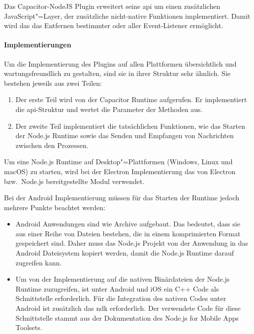 Das Capacitor-NodeJS Plugin erweitert seine \ac{api} um einen zusätzlichen JavaScript"=Layer, der zusätzliche nicht-native Funktionen implementiert.
Damit wird das das Entfernen bestimmter oder aller Event-Listener ermöglicht.

\paragraph{Implementierungen}

Um die Implementierung des Plugins auf allen Plattformen übersichtlich und wartungsfreundlich zu gestalten, sind sie in ihrer Struktur sehr ähnlich.
Sie bestehen jeweils aus zwei Teilen:

\begin{enumerate}
    \item 
    Der erste Teil wird von der Capacitor Runtime aufgerufen.
    Er implementiert die \acs{api}-Struktur und wertet die Parameter der Methoden aus.
    \item 
    Der zweite Teil implementiert die tatsächlichen Funktionen,
    wie das Starten der Node.js Runtime sowie das Senden und Empfangen von Nachrichten zwischen den Prozessen.
\end{enumerate}

Um eine Node.js Runtime auf Desktop"=Plattformen (Windows, Linux und macOS) zu starten, wird bei der Electron Implementierung das von Electron bzw.\ Node.js bereitgestellte Modul  verwendet.
\cite{electron:docs}

Bei der Android Implementierung müssen für das Starten der Runtime jedoch mehrere Punkte beachtet werden:

\begin{itemize}
    \item
    Android Anwendungen sind wie Archive aufgebaut.
    Das bedeutet, dass sie aus einer Reihe von Dateien bestehen, die in einem komprimierten Format gespeichert sind.
    Daher muss das Node.js Projekt von der Anwendung in das Android Dateisystem kopiert werden, damit die Node.js Runtime darauf zugreifen kann.
    \cite{nodejs-mobile:docs}

    \item 
    Um von der Implementierung auf die nativen Binärdateien der Node.js Runtime zuzugreifen, ist unter Android und iOS ein C++ Code als Schnittstelle erforderlich.
    Für die Integration des nativen Codes unter Android ist zusätzlich das \ac{ndk} erforderlich.
    Der verwendete Code für diese Schnittstelle stammt aus der Dokumentation des Node.js for Mobile Apps Toolsets.
    \cite{nodejs-mobile:docs}
\end{itemize}

